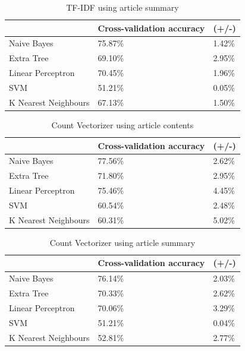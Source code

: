 \documentclass[a4paper,11pt]{report}
\begin{document}
\begin{table}[h!]
\centering
\caption{TF-IDF using article summary}
\label{tfidf-article-summary}
\begin{tabular}{|l|l|l|}
\hline
                     & Cross-validation accuracy & (+/-)  \\ \hline
Naive Bayes          & 75.87\%                   & 1.42\% \\ \hline
Extra Tree           & 69.10\%                   & 2.95\% \\ \hline
Linear Perceptron    & 70.45\%                   & 1.96\% \\ \hline
SVM                  & 51.21\%                   & 0.05\% \\ \hline
K Nearest Neighbours & 67.13\%                   & 1.50\% \\ \hline
\end{tabular}
\end{table}

\begin{table}[h!]
\centering
\caption{Count Vectorizer using article contents}
\label{count-article-summary}
\begin{tabular}{|l|l|l|}
\hline
                     & Cross-validation accuracy & (+/-)  \\ \hline
Naive Bayes          & 77.56\%                   & 2.62\% \\ \hline
Extra Tree           & 71.80\%                   & 2.95\% \\ \hline
Linear Perceptron    & 75.46\%                   & 4.45\% \\ \hline
SVM                  & 60.54\%                   & 2.48\% \\ \hline
K Nearest Neighbours & 60.31\%                   & 5.02\% \\ \hline
\end{tabular}
\end{table}


\begin{table}[h!]
\centering
\caption{Count Vectorizer using article summary}
\label{count-article-summary}
\begin{tabular}{|l|l|l|}
\hline
                     & Cross-validation accuracy & (+/-)  \\ \hline
Naive Bayes          & 76.14\%                   & 2.03\% \\ \hline
Extra Tree           & 70.33\%                   & 2.62\% \\ \hline
Linear Perceptron    & 70.06\%                   & 3.29\% \\ \hline
SVM                  & 51.21\%                   & 0.04\% \\ \hline
K Nearest Neighbours & 52.81\%                   & 2.77\% \\ \hline
\end{tabular}
\end{table}
\end{document}
